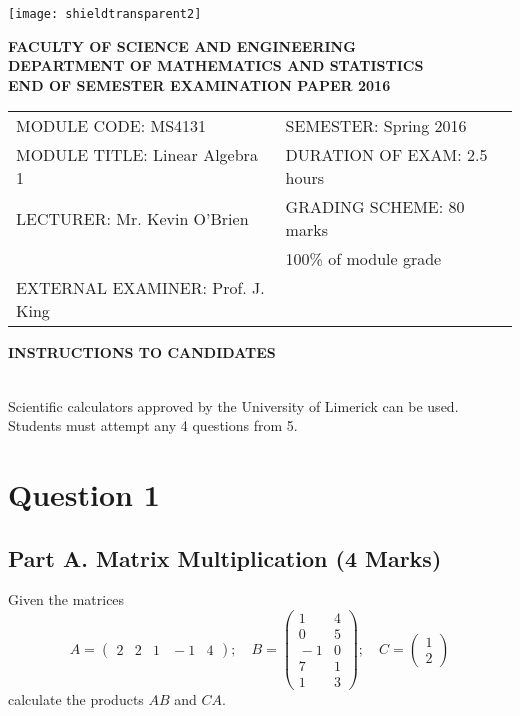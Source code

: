 \documentclass[a4paper,12pt]{article}
\begin{document}
\begin{center}
\texttt{[image: shieldtransparent2]}
\end{center}

\begin{center}
\vspace{1cm}
\large \bf {FACULTY OF SCIENCE AND ENGINEERING} \\[0.5cm]
\normalsize DEPARTMENT OF MATHEMATICS AND STATISTICS \\[1.25cm]
\large \bf {END OF SEMESTER EXAMINATION PAPER 2016} \\[1.5cm]
\end{center}

\begin{tabular}{ll}
MODULE CODE: MS4131 & SEMESTER: Spring 2016 \\[1cm]
MODULE TITLE: Linear Algebra 1 & DURATION OF EXAM: 2.5 hours \\[1cm]
LECTURER: Mr. Kevin O'Brien & GRADING SCHEME: 80 marks \\
& \phantom{GRADING SCHEME:} \footnotesize {100\% of module grade} \\[0.8cm]
EXTERNAL EXAMINER: Prof. J. King & \\
\end{tabular}
\bigskip
\begin{center}
{\bf INSTRUCTIONS TO CANDIDATES}
\end{center}

{\noindent \\ Scientific calculators approved by the University of Limerick can be used. \\
Students must attempt any 4 questions from 5.}
\newpage
\section*{Question 1}

	\subsection*{Part A. Matrix Multiplication (4 Marks)}	
	Given the matrices 
	$$
	A=\left(\begin{array}{ccccc} 
	2&2&1&\!\!\!-1&4\end{array}
	\right); \quad
	B =\left(\begin{array}{cc} 
	1&4\\0&5\\\!\!\!-1&0\\7&1\\1&3\end{array}
	\right); \quad
	C=\left(\begin{array}{c} 1\\2\end{array}
	\right)
	$$
	calculate the products $AB$ and $CA$.
\end{document}
